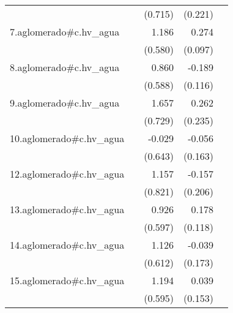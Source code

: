 {\begin{longtable}{l*{4}{D{.}{.}{-1}}}
            &                     &     (0.715)         &     (0.221)         &                     \\
\addlinespace
7.aglomerado#c.hv\_agua&                     &       1.186\sym{*}  &       0.274\sym{**} &                     \\
            &                     &     (0.580)         &     (0.097)         &                     \\
\addlinespace
8.aglomerado#c.hv\_agua&                     &       0.860         &      -0.189         &                     \\
            &                     &     (0.588)         &     (0.116)         &                     \\
\addlinespace
9.aglomerado#c.hv\_agua&                     &       1.657\sym{*}  &       0.262         &                     \\
            &                     &     (0.729)         &     (0.235)         &                     \\
\addlinespace
10.aglomerado#c.hv\_agua&                     &      -0.029         &      -0.056         &                     \\
            &                     &     (0.643)         &     (0.163)         &                     \\
\addlinespace
12.aglomerado#c.hv\_agua&                     &       1.157         &      -0.157         &                     \\
            &                     &     (0.821)         &     (0.206)         &                     \\
\addlinespace
13.aglomerado#c.hv\_agua&                     &       0.926         &       0.178         &                     \\
            &                     &     (0.597)         &     (0.118)         &                     \\
\addlinespace
14.aglomerado#c.hv\_agua&                     &       1.126         &      -0.039         &                     \\
            &                     &     (0.612)         &     (0.173)         &                     \\
\addlinespace
15.aglomerado#c.hv\_agua&                     &       1.194\sym{*}  &       0.039         &                     \\
            &                     &     (0.595)         &     (0.153)         &                     \\

\end{longtable}}
